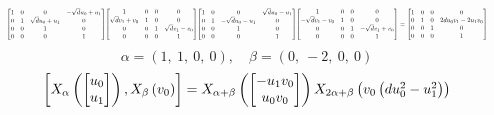 \documentclass[11pt]{article}
\theoremstyle{definition}
\begin{document}
\[
\scaletoalign{\textwidth}{{\left[\begin{matrix}1 & 0 & 0 & - \sqrt{d} u_{0} + u_{1}\\0 & 1 & \sqrt{d} u_{0} + u_{1} & 0\\0 & 0 & 1 & 0\\0 & 0 & 0 & 1\end{matrix}\right]} {\left[\begin{matrix}1 & 0 & 0 & 0\\\sqrt{d} v_{1} + v_{0} & 1 & 0 & 0\\0 & 0 & 1 & \sqrt{d} v_{1} - v_{0}\\0 & 0 & 0 & 1\end{matrix}\right]} {\left[\begin{matrix}1 & 0 & 0 & \sqrt{d} u_{0} - u_{1}\\0 & 1 & - \sqrt{d} u_{0} - u_{1} & 0\\0 & 0 & 1 & 0\\0 & 0 & 0 & 1\end{matrix}\right]} {\left[\begin{matrix}1 & 0 & 0 & 0\\- \sqrt{d} v_{1} - v_{0} & 1 & 0 & 0\\0 & 0 & 1 & - \sqrt{d} v_{1} + v_{0}\\0 & 0 & 0 & 1\end{matrix}\right]} = {\left[\begin{matrix}1 & 0 & 0 & 0\\0 & 1 & 0 & 2 d u_{0} v_{1} - 2 u_{1} v_{0}\\0 & 0 & 1 & 0\\0 & 0 & 0 & 1\end{matrix}\right]}}
\]
\[
\alpha = \left( 1, \  1, \  0, \  0\right), \quad \beta = \left( 0, \  -2, \  0, \  0\right)
\]
\[
\scaletoalign{\textwidth}{\left[ X_{\alpha}\left(\left[\begin{matrix}u_{0}\\u_{1}\end{matrix}\right]\right), X_{\beta}\left(v_{0}\right) \right] = X_{\alpha + \beta}\left(\left[\begin{matrix}- u_{1} v_{0}\\u_{0} v_{0}\end{matrix}\right]\right) X_{2\alpha + \beta}\left(v_{0} \left(d u_{0}^{2} - u_{1}^{2}\right)\right)}
\]
\end{document}
